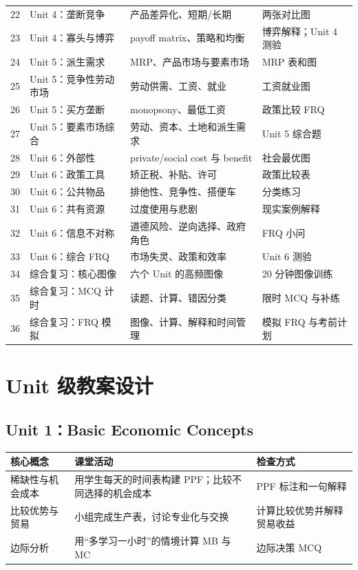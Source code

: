 \documentclass[11pt,a4paper]{ctexart}
\begin{document}
\begin{longtable}{p{0.8cm}p{2.7cm}p{5.2cm}p{4.2cm}}
22 & Unit 4：垄断竞争 & 产品差异化、短期/长期 & 两张对比图\\
23 & Unit 4：寡头与博弈 & payoff matrix、策略和均衡 & 博弈解释；Unit 4 测验\\
24 & Unit 5：派生需求 & MRP、产品市场与要素市场 & MRP 表和图\\
25 & Unit 5：竞争性劳动市场 & 劳动供需、工资、就业 & 工资就业图\\
26 & Unit 5：买方垄断 & monopsony、最低工资 & 政策比较 FRQ\\
27 & Unit 5：要素市场综合 & 劳动、资本、土地和派生需求 & Unit 5 综合题\\
28 & Unit 6：外部性 & private/social cost 与 benefit & 社会最优图\\
29 & Unit 6：政策工具 & 矫正税、补贴、许可 & 政策比较表\\
30 & Unit 6：公共物品 & 排他性、竞争性、搭便车 & 分类练习\\
31 & Unit 6：共有资源 & 过度使用与悲剧 & 现实案例解释\\
32 & Unit 6：信息不对称 & 道德风险、逆向选择、政府角色 & FRQ 小问\\
33 & Unit 6：综合 FRQ & 市场失灵、政策和效率 & Unit 6 测验\\
34 & 综合复习：核心图像 & 六个 Unit 的高频图像 & 20 分钟图像训练\\
35 & 综合复习：MCQ 计时 & 读题、计算、错因分类 & 限时 MCQ 与补练\\
36 & 综合复习：FRQ 模拟 & 图像、计算、解释和时间管理 & 模拟 FRQ 与考前计划\\
\bottomrule
\end{longtable}
\normalsize

\section{Unit 级教案设计}

\subsection{Unit 1：Basic Economic Concepts}

\begin{tabularx}{\textwidth}{p{2.8cm}YY}
\toprule
核心概念 & 课堂活动 & 检查方式\\
\midrule
稀缺性与机会成本 & 用学生每天的时间表构建 PPF；比较不同选择的机会成本 & PPF 标注和一句解释\\
比较优势与贸易 & 小组完成生产表，讨论专业化与交换 & 计算比较优势并解释贸易收益\\
边际分析 & 用“多学习一小时”的情境计算 MB 与 MC & 边际决策 MCQ\\
\bottomrule
\end{tabularx}
\end{document}
